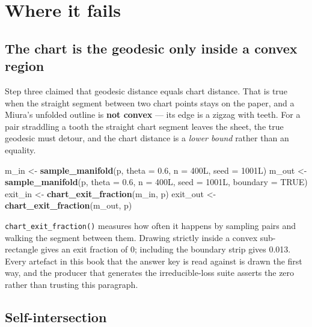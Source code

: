 \documentclass[
  british,
  a4paper,
]{book}
\newenvironment{Shaded}{\begin{snugshade}}{\end{snugshade}}
\newcommand{\AttributeTok}[1]{\textcolor[rgb]{0.13,0.29,0.53}{#1}}
\newcommand{\ConstantTok}[1]{\textcolor[rgb]{0.56,0.35,0.01}{#1}}
\newcommand{\DataTypeTok}[1]{\textcolor[rgb]{0.13,0.29,0.53}{#1}}
\newcommand{\DecValTok}[1]{\textcolor[rgb]{0.00,0.00,0.81}{#1}}
\newcommand{\FloatTok}[1]{\textcolor[rgb]{0.00,0.00,0.81}{#1}}
\newcommand{\FunctionTok}[1]{\textcolor[rgb]{0.13,0.29,0.53}{\textbf{#1}}}
\newcommand{\NormalTok}[1]{#1}
\newcommand{\OtherTok}[1]{\textcolor[rgb]{0.56,0.35,0.01}{#1}}
\begin{document}
\section{Where it fails}\label{geom-limits}

\subsection{The chart is the geodesic only inside a convex region}\label{the-chart-is-the-geodesic-only-inside-a-convex-region}

Step three claimed that geodesic distance equals chart distance. That is true
when the straight segment between two chart points stays on the paper, and a
Miura's unfolded outline is \textbf{not convex} --- its edge is a zigzag with teeth. For
a pair straddling a tooth the straight chart segment leaves the sheet, the true
geodesic must detour, and the chart distance is a \emph{lower bound} rather than an
equality.

\begin{Shaded}
\begin{Highlighting}[]
\NormalTok{m\_in  }\OtherTok{\textless{}{-}} \FunctionTok{sample\_manifold}\NormalTok{(p, }\AttributeTok{theta =} \FloatTok{0.6}\NormalTok{, }\AttributeTok{n =} \DecValTok{400}\DataTypeTok{L}\NormalTok{, }\AttributeTok{seed =} \DecValTok{1001}\DataTypeTok{L}\NormalTok{)}
\NormalTok{m\_out }\OtherTok{\textless{}{-}} \FunctionTok{sample\_manifold}\NormalTok{(p, }\AttributeTok{theta =} \FloatTok{0.6}\NormalTok{, }\AttributeTok{n =} \DecValTok{400}\DataTypeTok{L}\NormalTok{, }\AttributeTok{seed =} \DecValTok{1001}\DataTypeTok{L}\NormalTok{, }\AttributeTok{boundary =} \ConstantTok{TRUE}\NormalTok{)}
\NormalTok{exit\_in  }\OtherTok{\textless{}{-}} \FunctionTok{chart\_exit\_fraction}\NormalTok{(m\_in,  p)}
\NormalTok{exit\_out }\OtherTok{\textless{}{-}} \FunctionTok{chart\_exit\_fraction}\NormalTok{(m\_out, p)}
\end{Highlighting}
\end{Shaded}

\texttt{chart\_exit\_fraction()} measures how often it happens by sampling pairs and
walking the segment between them. Drawing strictly inside a convex sub-rectangle
gives an exit fraction of 0; including the boundary strip
gives 0.013. Every artefact in this book that the answer key is
read against is drawn the first way, and the producer that generates the
irreducible-loss suite asserts the zero rather than trusting this paragraph.

\subsection{Self-intersection}\label{self-intersection}
\end{document}
